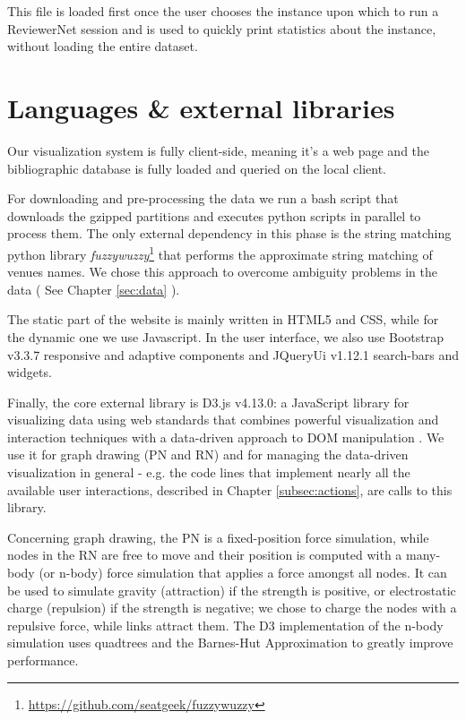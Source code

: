 This file is loaded first once the user chooses the instance upon which to run a ReviewerNet session and is used to quickly print statistics about the instance, without loading the entire dataset.
\section{Languages \& external libraries}
\label{sec:lang}

Our visualization system is fully client-side, meaning it's a web page and the bibliographic database is fully loaded and queried on the local client.

For downloading and pre-processing the data we run a bash script that downloads the gzipped partitions and executes python scripts in parallel to process them. The only external dependency in this phase is the string matching python library \emph{fuzzywuzzy}\footnote{\url{https://github.com/seatgeek/fuzzywuzzy}} that performs the approximate string matching of venues names. We chose this approach to overcome ambiguity problems in the data ( See Chapter \ref{sec:data} ).

The static part of the website is mainly written in HTML5 and CSS, while for the dynamic one we use Javascript. In the user interface, we also use Bootstrap v3.3.7 responsive and adaptive components and JQueryUi v1.12.1 search-bars and widgets.

Finally, the core external library is D3.js v4.13.0: a JavaScript library for visualizing data using web standards that combines powerful visualization and interaction techniques with a data-driven approach to DOM manipulation \cite{D3js11}. We use it for graph drawing (PN and RN) and for managing the data-driven visualization in general - e.g. the code lines that implement nearly all the available user interactions, described in Chapter \ref{subsec:actions}, are calls to this library.

Concerning graph drawing, the PN is a fixed-position force simulation, while nodes in the RN are free to move and their position is computed with a many-body (or n-body) force simulation that applies a force amongst all nodes. It can be used to simulate gravity (attraction) if the strength is positive, or electrostatic charge (repulsion) if the strength is negative; we chose to charge the nodes with a repulsive force, while links attract them. The D3 implementation of the n-body simulation uses quadtrees and the Barnes-Hut Approximation \cite{Barnes1986} to greatly improve performance.

